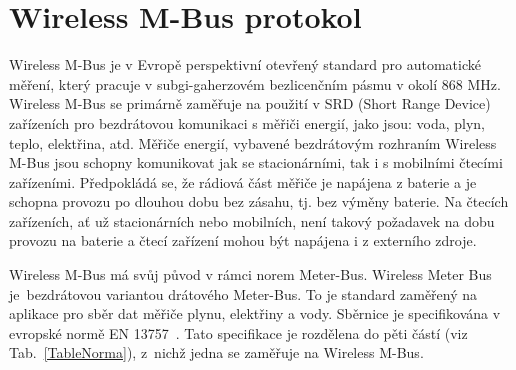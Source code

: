 \chapter{Wireless M-Bus protokol}
Wireless M-Bus je v Evropě perspektivní otevřený standard pro automatické měření, který pracuje v subgi-gaherzovém bezlicenčním pásmu v okolí 868 MHz. Wireless M-Bus se primárně zaměřuje na použití v SRD (Short Range Device) zařízeních pro bezdrátovou komunikaci s měřiči energií, jako jsou: voda, plyn, teplo, elektřina, atd. Měřiče energií, vybavené bezdrátovým rozhraním Wireless M-Bus jsou schopny komunikovat jak se stacionárními, tak i s mobilními čtecími zařízeními. Předpokládá se, že rádiová část měřiče je napájena z baterie a je schopna provozu po dlouhou dobu bez zásahu, tj. bez výměny baterie. Na čtecích zařízeních, ať už stacionárních nebo mobilních, není takový požadavek na dobu provozu na baterie a čtecí zařízení mohou být napájena i z externího zdroje.

Wireless M-Bus má svůj původ v rámci norem Meter-Bus. Wireless Meter Bus je~bezdrátovou variantou drátového Meter-Bus. To je standard zaměřený na aplikace pro sběr dat měřiče plynu, elektřiny a vody. Sběrnice je specifikována v evropské normě EN 13757~\cite{Norma1}. Tato specifikace je rozdělena do pěti částí (viz Tab.~\ref{TableNorma}), z~nichž jedna se zaměřuje na Wireless M-Bus.

